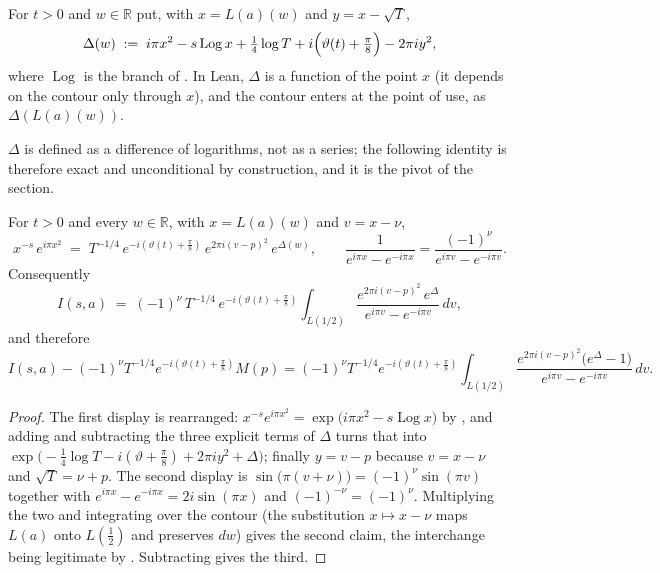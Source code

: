 \begin{definition}
\label{def:rsf_discrepancy}
\leanok
{}
For $t>0$ and $w\in\mathbb{R}$ put, with $x=L(a)(w)$ and $y=x-\sqrt T$,
\[
  \Delta(w)\;:=\;i\pi x^{2}-s\operatorname{Log}x
     +\tfrac14\log T+i\Bigl(\vartheta(t)+\tfrac\pi8\Bigr)-2\pi iy^{2},
\]
where $\operatorname{Log}$ is the branch of .  In Lean, $\Delta$ is a function
of the point $x$ (it depends on the contour only through $x$), and the contour enters at the
point of use, as $\Delta(L(a)(w))$.
\end{definition}

$\Delta$ is defined as a difference of logarithms, not as a series; the following identity is
therefore exact and unconditional by construction, and it is the pivot of the section.

\begin{lemma}
\label{lem:rsf_factor}
\leanok
{}
For $t>0$ and every $w\in\mathbb{R}$, with $x=L(a)(w)$ and $v=x-\nu$,
\[
  x^{-s}\,e^{i\pi x^{2}}\;=\;T^{-1/4}\,e^{-i\left(\vartheta(t)+\frac\pi8\right)}\,
     e^{2\pi i(v-p)^{2}}\,e^{\Delta(w)},
  \qquad
  \frac{1}{e^{i\pi x}-e^{-i\pi x}}=\frac{(-1)^{\nu}}{e^{i\pi v}-e^{-i\pi v}} .
\]
Consequently
\[
  I(s,a)\;=\;(-1)^{\nu}\,T^{-1/4}\,e^{-i\left(\vartheta(t)+\frac\pi8\right)}
    \int_{L(1/2)}\frac{e^{2\pi i(v-p)^{2}}\,e^{\Delta}}{e^{i\pi v}-e^{-i\pi v}}\,dv ,
\]
and therefore
\[
  I(s,a)-(-1)^{\nu}T^{-1/4}e^{-i\left(\vartheta(t)+\frac\pi8\right)}M(p)
   =(-1)^{\nu}T^{-1/4}e^{-i\left(\vartheta(t)+\frac\pi8\right)}
     \int_{L(1/2)}\frac{e^{2\pi i(v-p)^{2}}\bigl(e^{\Delta}-1\bigr)}{e^{i\pi v}-e^{-i\pi v}}\,dv .
\]
\end{lemma}

\begin{proof}
\leanok
{}
The first display is  rearranged: $x^{-s}e^{i\pi x^{2}}
=\exp\bigl(i\pi x^{2}-s\operatorname{Log}x\bigr)$ by , and adding and
subtracting the three explicit terms of $\Delta$ turns that into
$\exp\bigl(-\tfrac14\log T-i(\vartheta+\tfrac\pi8)+2\pi iy^{2}+\Delta\bigr)$; finally
$y=v-p$ because $v=x-\nu$ and $\sqrt T=\nu+p$.  The second display is
$\sin\bigl(\pi(v+\nu)\bigr)=(-1)^{\nu}\sin(\pi v)$ together with
$e^{i\pi x}-e^{-i\pi x}=2i\sin(\pi x)$ and $(-1)^{-\nu}=(-1)^{\nu}$.  Multiplying the two and
integrating over the contour (the substitution $x\mapsto x-\nu$ maps $L(a)$ onto
$L(\tfrac12)$ and preserves $dw$) gives the second claim, the interchange being legitimate by
.  Subtracting  gives the third.
\end{proof}

